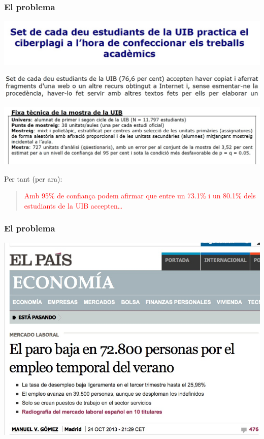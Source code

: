 \documentclass[12pt,t]{beamer}
\newcommand{\red}[1]{\textcolor{red}{#1}}
\theoremstyle{plain}
\theoremstyle{definition}
\begin{document}
\begin{frame}
\frametitle{El problema}
\vspace*{-1cm}

\begin{center}
\hspace*{-0.5cm}
\includegraphics[width=1.1\linewidth]{plagiUIB1.jpg}\medskip

\hspace*{-0.4cm}
\includegraphics[width=1.05\linewidth]{plagiUIB3.jpg}\medskip

\hspace*{-0.5cm}\includegraphics[width=1.1\linewidth]{plagiUIB2.jpg}
\end{center}
\vspace*{-1ex}

Per tant (per ara):
\begin{quote}
\red{Amb 95\% de confiança podem afirmar que entre un 73.1\% i un 80.1\% dels estudiants de la UIB
accepten\ldots}
\end{quote}
\end{frame}


\begin{frame}
\frametitle{El problema}
\vspace*{-0.5cm}

\begin{center}
\includegraphics[width=1\linewidth]{EPA3}
\end{center}
\end{frame}
\end{document}
